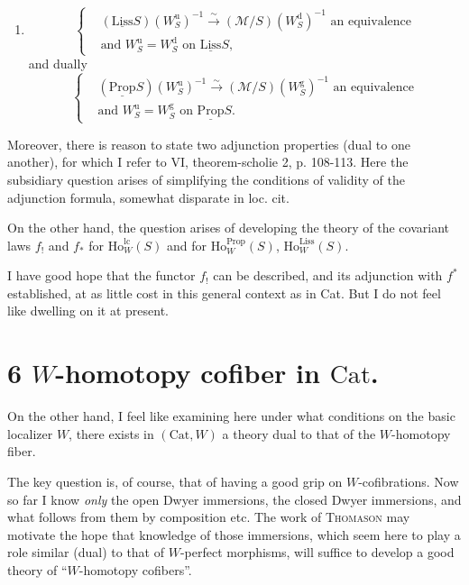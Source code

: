 \begin{enumerate}
\item[{\circled{b}}]
\[
\left\{
\begin{aligned}
&(\underline{\mathrm{Liss}}S)(W^{\mathrm{u}}_S)^{-1} \xrightarrow{\sim} (\mathcal{M}/S)(W^{\mathrm{d}}_S)^{-1} \text{ an equivalence}\\
&\text{and } W^{\mathrm{u}}_S = W^{\mathrm{d}}_S \text{ on } \underline{\mathrm{Liss}}S,
\end{aligned}
\right.
\]
and dually
\[
\left\{
\begin{aligned}
&(\underline{\mathrm{Prop}}S)(W^{\mathrm{u}}_S)^{-1} \xrightarrow{\sim} (\mathcal{M}/S)(W^{\mathrm{g}}_S)^{-1} \text{ an equivalence}\\
&\text{and } W^{\mathrm{u}}_S = W^{\mathrm{g}}_S \text{ on } \underline{\mathrm{Prop}}S.
\end{aligned}
\right.
\]
\end{enumerate}

Moreover, there is reason to state  two adjunction properties (dual to one another), for which I refer to VI, theorem-scholie 2, p. 108-113. Here the subsidiary question arises of simplifying the conditions of validity of the adjunction formula, somewhat disparate in loc. cit.

On the other hand, the question arises of developing the theory of the covariant laws $f_!$ and $f_*$ for $\mathrm{Ho}^{\mathrm{lc}}_W(S)$ and for $\mathrm{Ho}^{\mathrm{Prop}}_W(S)$, $\mathrm{Ho}^{\mathrm{Liss}}_W(S)$.


I have good hope that the functor $f_!$ can be described, and its adjunction with $f^*$ established, at as little cost in this general context as in Cat. But I do not feel like dwelling on it at present.

\section*{6 $W$-homotopy cofiber in $\mathrm{Cat}$.}

On the other hand, I feel like examining here under what conditions on the basic localizer $W$, there exists in $(\mathrm{Cat},W)$ a theory dual to that of the $W$-homotopy fiber.

The key question is, of course, that of having a good grip on $W$-cofibrations. Now so far I know \textit{only} the open Dwyer immersions, the closed Dwyer immersions, and what follows from them by composition etc. The work of \textsc{Thomason} may motivate the hope that knowledge of those immersions, which seem here to play a role similar (dual) to that of $W$-perfect morphisms, will suffice to develop a good theory of ``$W$-homotopy cofibers''.

